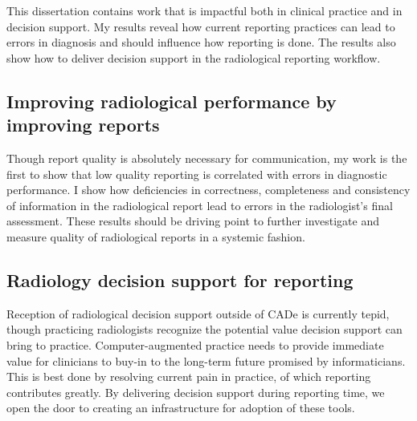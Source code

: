 This dissertation contains work that is impactful both in clinical practice and in decision support. My results reveal how current reporting practices can lead to errors in diagnosis and should influence how reporting is done. The results also show how to deliver decision support in the radiological reporting workflow.

\subsection{Improving radiological performance by improving reports}
Though report quality is absolutely necessary for communication, my work is the first to show that low quality reporting is correlated with errors in diagnostic performance. I show how deficiencies in correctness, completeness and consistency of information in the radiological report lead to errors in the radiologist's final assessment. These results should be driving point to further investigate and measure quality of radiological reports in a systemic fashion. 

\subsection{Radiology decision support for reporting}
Reception of radiological decision support outside of CADe is currently tepid, though practicing radiologists recognize the potential value decision support can bring to practice. Computer-augmented practice needs to provide immediate value for clinicians to buy-in to the long-term future promised by informaticians. This is best done by resolving current pain in practice, of which reporting contributes greatly. By delivering decision support during reporting time, we open the door to creating an infrastructure for adoption of these tools.